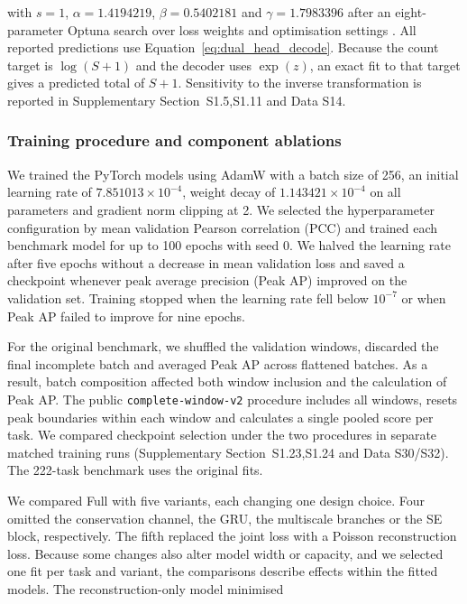 \documentclass[webpdf,contemporary,large]{current_assets/oup-authoring-template}
\newcommand{\supsect}[1]{Supplementary Section~#1}
\begin{document}
with $s=1$, $\alpha=1.4194219$, $\beta=0.5402181$ and $\gamma=1.7983396$ after an eight-parameter Optuna search over loss weights and optimisation settings \citep{akiba2019optuna}. All reported predictions use Equation~\ref{eq:dual_head_decode}. Because the count target is $\log(S+1)$ and the decoder uses $\exp(z)$, an exact fit to that target gives a predicted total of $S+1$. Sensitivity to the inverse transformation is reported in \supsect{S1.5,S1.11} and Data S14.

\subsubsection{Training procedure and component ablations}\label{subsec:ml}

We trained the PyTorch models using AdamW with a batch size of 256, an initial learning rate of $7.851013\times10^{-4}$, weight decay of $1.143421\times10^{-4}$ on all parameters and gradient norm clipping at 2. We selected the hyperparameter configuration by mean validation Pearson correlation (PCC) and trained each benchmark model for up to 100 epochs with seed 0. We halved the learning rate after five epochs without a decrease in mean validation loss and saved a checkpoint whenever peak average precision (Peak AP) improved on the validation set. Training stopped when the learning rate fell below $10^{-7}$ or when Peak AP failed to improve for nine epochs.

For the original benchmark, we shuffled the validation windows, discarded the final incomplete batch and averaged Peak AP across flattened batches. As a result, batch composition affected both window inclusion and the calculation of Peak AP. The public \texttt{complete-window-v2} procedure includes all windows, resets peak boundaries within each window and calculates a single pooled score per task. We compared checkpoint selection under the two procedures in separate matched training runs (\supsect{S1.23,S1.24} and Data S30/S32). The 222-task benchmark uses the original fits.

We compared Full with five variants, each changing one design choice. Four omitted the conservation channel, the GRU, the multiscale branches or the SE block, respectively. The fifth replaced the joint loss with a Poisson reconstruction loss. Because some changes also alter model width or capacity, and we selected one fit per task and variant, the comparisons describe effects within the fitted models. The reconstruction-only model minimised
\end{document}
